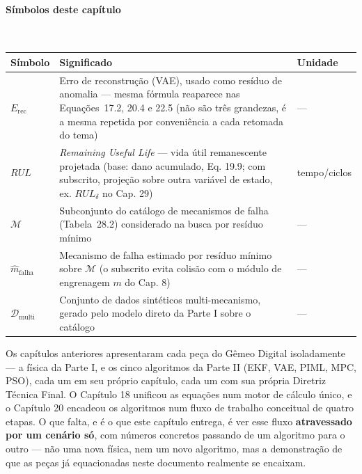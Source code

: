 \documentclass[12pt,a4paper]{article}
\numberwithin{equation}{section}
\numberwithin{table}{section}
\numberwithin{figure}{section}
\begin{document}
\paragraph{Símbolos deste capítulo}\mbox{}\\[-0.5em]
{\small
\begin{longtable}{>{\raggedright\arraybackslash}p{2.6cm} >{\raggedright\arraybackslash}p{9.2cm} >{\raggedright\arraybackslash}p{2.6cm}}
	\toprule
	\textbf{Símbolo} & \textbf{Significado} & \textbf{Unidade} \\ \midrule
	\endhead
	$E_{\text{rec}}$ & Erro de reconstrução (VAE), usado como resíduo de anomalia — mesma fórmula reaparece nas Equações~17.2, 20.4 e 22.5 (não são três grandezas, é a mesma repetida por conveniência a cada retomada do tema) & --- \\
	$RUL$ & \textit{Remaining Useful Life} — vida útil remanescente projetada (base: dano acumulado, Eq. 19.9; com subscrito, projeção sobre outra variável de estado, ex. $RUL_\delta$ no Cap. 29) & tempo/ciclos \\
	$\mathcal{M}$ & Subconjunto do catálogo de mecanismos de falha (Tabela~28.2) considerado na busca por resíduo mínimo & --- \\
	$\hat{m}_{\text{falha}}$\dag & Mecanismo de falha estimado por resíduo mínimo sobre $\mathcal{M}$ (o subscrito evita colisão com o módulo de engrenagem $m$ do Cap. 8) & --- \\
	$\mathcal{D}_{\text{multi}}$ & Conjunto de dados sintéticos multi-mecanismo, gerado pelo modelo direto da Parte I sobre o catálogo & --- \\
	\bottomrule
\end{longtable}
}






Os capítulos anteriores apresentaram cada peça do Gêmeo Digital isoladamente — a física da Parte I, e os cinco algoritmos da Parte II (EKF, VAE, PIML, MPC, PSO), cada um em seu próprio capítulo, cada um com sua própria Diretriz Técnica Final. O Capítulo 18 unificou as equações num motor de cálculo único, e o Capítulo 20 encadeou os algoritmos num fluxo de trabalho conceitual de quatro etapas. O que falta, e é o que este capítulo entrega, é ver esse fluxo \textbf{atravessado por um cenário só}, com números concretos passando de um algoritmo para o outro — não uma nova física, nem um novo algoritmo, mas a demonstração de que as peças já equacionadas neste documento realmente se encaixam.
\end{document}
